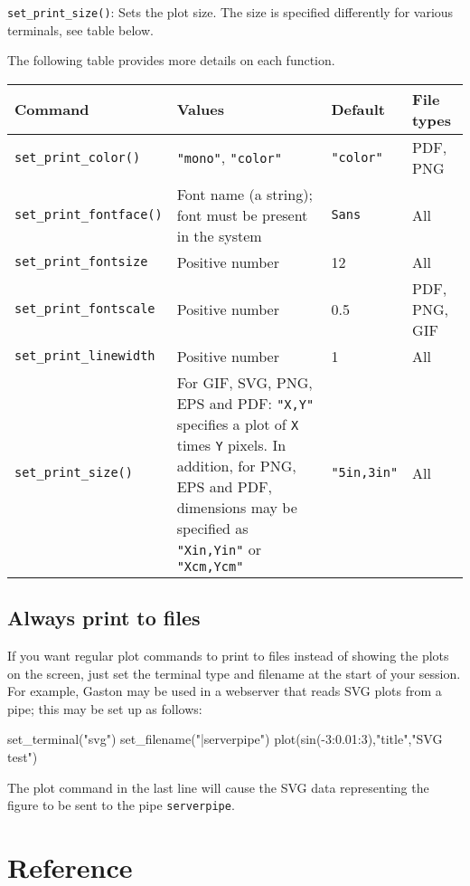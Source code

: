 \documentclass[11pt]{article}
\newcommand{\cmd}[1]{\texttt{#1}}
\begin{document}
\cmd{set\_print\_size()}: Sets the plot size. The size is specified differently
for various terminals, see table below.

The following table provides more details on each function.

\begin{center}
\begin{tabular}{lp{4cm}ll}
	\toprule
	\textbf{Command} & \textbf{Values} & \textbf{Default} & \textbf{File types}
	\\
	\midrule
	\cmd{set\_print\_color()} & \cmd{"mono"}, \cmd{"color"} & \cmd{"color"} &
	PDF, PNG \\
	\cmd{set\_print\_fontface()} & Font name (a string); font must be present
	in the system & \cmd{Sans} & All \\
	\cmd{set\_print\_fontsize} & Positive number & 12 & All \\
	\cmd{set\_print\_fontscale} & Positive number & 0.5 & PDF, PNG, GIF \\
	\cmd{set\_print\_linewidth} & Positive number & 1 & All \\
	\cmd{set\_print\_size()} & For GIF, SVG, PNG, EPS and PDF: \cmd{"X,Y"}
	specifies a plot of
	\cmd{X} times \cmd{Y} pixels. In addition, for PNG, EPS and PDF, dimensions
	may be specified as \cmd{"Xin,Yin"} or \cmd{"Xcm,Ycm"} & \cmd{"5in,3in"} &
	All \\
	\bottomrule
\end{tabular}
\end{center}

\subsection{Always print to files}

If you want regular plot commands to print to files instead of showing the
plots on the screen, just set the terminal type and filename at the start of
your session. For example, Gaston may be used in a webserver that reads SVG
plots from a pipe; this may be set up as follows:
\begin{juliacode}
set_terminal("svg")
set_filename("|serverpipe")
plot(sin(-3:0.01:3),"title","SVG test")
\end{juliacode}
The plot command in the last line will cause the SVG data representing the
figure to be sent to the pipe \cmd{serverpipe}.

\section{Reference}
\label{refer}
\end{document}

